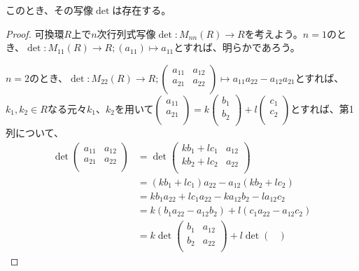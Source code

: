 \documentclass[dvipdfmx]{jsarticle}
\begin{document}
\begin{thm}[行列式写像の存在性]\label{2.1.11.1}
このとき、その写像$\det$は存在する。
\end{thm}
\begin{proof}
可換環$R$上で$n$次行列式写像$\det:M_{nn}(R) \rightarrow R$を考えよう。$n = 1$のとき、$\det:M_{11}(R) \rightarrow R;\left( a_{11} \right) \mapsto a_{11}$とすれば、明らかであろう。\par
$n = 2$のとき、$\det:M_{22}(R) \rightarrow R;\begin{pmatrix}
a_{11} & a_{12} \\
a_{21} & a_{22} \\
\end{pmatrix} \mapsto a_{11}a_{22} - a_{12}a_{21}$とすれば、$k_{1},k_{2} \in R$なる元々$k_{1}$、$k_{2}$を用いて$\begin{pmatrix}
a_{11} \\
a_{21} \\
\end{pmatrix} = k\begin{pmatrix}
b_{1} \\
b_{2} \\
\end{pmatrix} + l\begin{pmatrix}
c_{1} \\
c_{2} \\
\end{pmatrix}$とすれば、第1列について、
\begin{align*}
\det\begin{pmatrix}
a_{11} & a_{12} \\
a_{21} & a_{22} \\
\end{pmatrix} &= \det\begin{pmatrix}
kb_{1} + lc_{1} & a_{12} \\
kb_{2} + lc_{2} & a_{22} \\
\end{pmatrix}\\
&= \left( kb_{1} + lc_{1} \right)a_{22} - a_{12}\left( kb_{2} + lc_{2} \right)\\
&= kb_{1}a_{22} + lc_{1}a_{22} - ka_{12}b_{2} - la_{12}c_{2}\\
&= k\left( b_{1}a_{22} - a_{12}b_{2} \right) + l\left( c_{1}a_{22} - a_{12}c_{2} \right)\\
&= k\det\begin{pmatrix}
b_{1} & a_{12} \\
b_{2} & a_{22} \\
\end{pmatrix} + l\det\begin{pmatrix}

\end{pmatrix}
\end{align*}
\end{proof}
\end{document}
